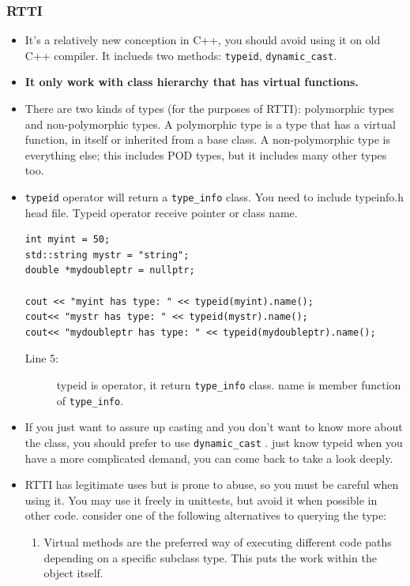 \documentclass[a4paper,11pt,twoside]{book}
\begin{document}
\subsubsection{RTTI}
\begin{itemize}
	\item It's a relatively new conception in C++, you should avoid using it on old C++ compiler. It inclueds two methods: \texttt{typeid}, \texttt{dynamic\_cast}.
	
	\item \textbf{It only work with class hierarchy that has virtual functions. }
	
	\item There are two kinds of types (for the purposes of RTTI): polymorphic types and non-polymorphic types. A polymorphic type is a type that has a virtual function, in itself or inherited from a base class. A non-polymorphic type is everything else; this includes POD types, but it includes many other types too.
	
	\item \texttt{typeid} operator will return a \texttt{type\_info} class.  You need to include typeinfo.h head file. Typeid operator receive pointer or class name.
	
\begin{lstlisting}
int myint = 50;
std::string mystr = "string";
double *mydoubleptr = nullptr;
	
cout << "myint has type: " << typeid(myint).name();
cout<< "mystr has type: " << typeid(mystr).name();
cout<< "mydoubleptr has type: " << typeid(mydoubleptr).name();
\end{lstlisting}
\begin{description}
	\item[Line 5:] typeid is operator, it return \texttt{type\_info} class. name is member function of \texttt{type\_info}.
\end{description}
	\item If you just want to assure up casting and you don't want to know more about the class, you should prefer to use \texttt{dynamic\_cast} . just know typeid when you have a more complicated demand, you can come back to take a look deeply.
	
	\item RTTI has legitimate uses but is prone to abuse, so you must be careful when using it. You may use it freely in unittests, but avoid it when possible in other code. consider one of the following alternatives to querying the type:
	\begin{enumerate}
		\item Virtual methods are the preferred way of executing different code paths depending on a specific subclass type. This puts the work within the object itself.
		

\end{enumerate}
\end{itemize}
\end{document}
